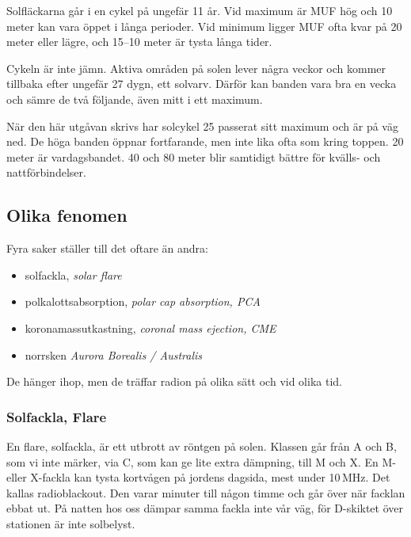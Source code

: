 Solfläckarna går i en cykel på ungefär 11 år. Vid maximum är MUF hög och
10 meter kan vara öppet i långa perioder. Vid minimum ligger MUF ofta kvar
på 20 meter eller lägre, och 15--10 meter är tysta långa tider.

Cykeln är inte jämn. Aktiva områden på solen lever några veckor och kommer
tillbaka efter ungefär 27 dygn, ett solvarv. Därför kan banden vara bra en
vecka och sämre de två följande, även mitt i ett maximum.

När den här utgåvan skrivs har solcykel 25 passerat sitt maximum och är på
väg ned. De höga banden öppnar fortfarande, men inte lika ofta som kring
toppen. 20 meter är vardagsbandet. 40 och 80 meter blir samtidigt bättre
för kvälls- och nattförbindelser.

\subsection{Olika fenomen}

Fyra saker ställer till det oftare än andra:

\begin{itemize}
  \item solfackla, {\it solar flare}
  \item polkalottsabsorption, {\it polar cap absorption, PCA}
  \item koronamassutkastning, {\it coronal mass ejection, CME}
  \item norrsken {\it Aurora Borealis / Australis}
\end{itemize}

De hänger ihop, men de träffar radion på olika sätt och vid olika tid.

\subsubsection{Solfackla, Flare}
 
 

En flare, solfackla, är ett utbrott av röntgen på solen. Klassen går
från A och B, som vi inte märker, via C, som kan ge lite extra
dämpning, till M och X. En M- eller X-fackla kan tysta kortvågen på
jordens dagsida, mest under 10\,MHz. Det kallas radioblackout. Den
varar minuter till någon timme och går över när facklan ebbat ut. På
natten hos oss dämpar samma fackla inte vår väg, för D-skiktet över
stationen är inte solbelyst.

